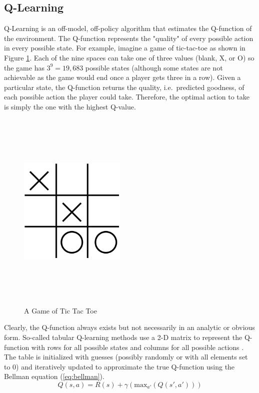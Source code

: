 \subsection{Q-Learning}
Q-Learning is an off-model, off-policy algorithm that estimates the Q-function of the environment. The Q-function represents the "quality" of every possible action in every possible state. For example, imagine a game of tic-tac-toe as shown in Figure \ref{fig:tictactoe}. Each of the nine spaces can take one of three values (blank, X, or O) so the game has $3^9=19,683$ possible states (although some states are not achievable as the game would end once a player gets three in a row). Given a particular state, the Q-function returns the quality, i.e.\ predicted goodness, of each possible action the player could take. Therefore, the optimal action to take is simply the one with the highest Q-value. 
\begin{figure}[H]   %
	\centering \includegraphics[width=2in, height=3.85in, keepaspectratio]{figures/tictactoe.pdf}
	\caption{A Game of Tic Tac Toe}\label{fig:tictactoe}
\end{figure}

Clearly, the Q-function always exists but not necessarily in an analytic or obvious form. So-called tabular Q-learning methods use a 2-D matrix to represent the Q-function with rows for all possible states and columns for all possible actions \cite{mccullock}. The table is initialized with guesses (possibly randomly or with all elements set to 0) and iteratively updated to approximate the true Q-function using the Bellman equation (\ref{eq:bellman}).
\begin{equation}
	\label{eq:bellman}
	Q(s,a)=R(s) + \gamma (\text{max}_{a'}(Q(s',a')))
\end{equation}

